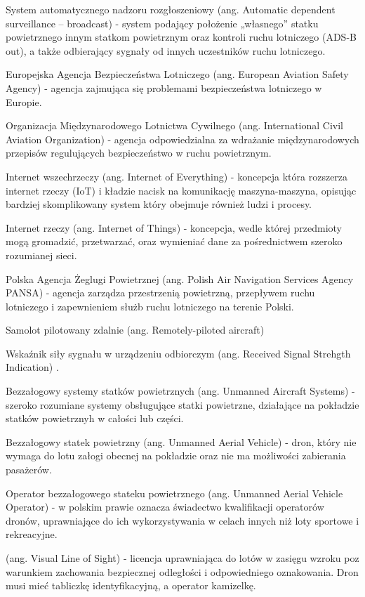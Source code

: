 \suppressfloats[t]

\begin{description}[\setleftmargin{65pt}\setlabelstyle{\bfseries}]
    \leftskip=1cm
    \item[ADS-B] System automatycznego nadzoru rozgłoszeniowy (ang. Automatic dependent surveillance – broadcast) - system podający położenie „własnego” statku powietrznego innym statkom powietrznym oraz kontroli ruchu lotniczego (ADS-B out), a także odbierający sygnały od innych uczestników ruchu lotniczego.
    \item[EASA] Europejska Agencja Bezpieczeństwa Lotniczego (ang. European Aviation Safety Agency) - agencja zajmująca się problemami bezpieczeństwa lotniczego w Europie.
    \item[ICAO] Organizacja Międzynarodowego Lotnictwa Cywilnego (ang. International Civil Aviation Organization) - agencja odpowiedzialna za wdrażanie międzynarodowych przepisów regulujących bezpieczeństwo w ruchu powietrznym.
    \item[IoE] Internet wszechrzeczy (ang. Internet of Everything) - koncepcja która rozszerza internet rzeczy (IoT) i kładzie nacisk na komunikację maszyna-maszyna, opisując bardziej skomplikowany system który obejmuje również ludzi i procesy.
    \item[IoT] Internet rzeczy (ang. Internet of Things) - koncepcja, wedle której przedmioty mogą gromadzić, przetwarzać, oraz wymieniać dane za pośrednictwem szeroko rozumianej sieci.
    \item[PAŻP] Polska Agencja Żeglugi Powietrznej (ang. Polish Air Navigation Services Agency PANSA) - agencja zarządza przestrzenią powietrzną, przepływem ruchu lotniczego i zapewnieniem służb ruchu lotniczego na terenie Polski.
    \item[RPA] Samolot pilotowany zdalnie (ang. Remotely-piloted aircraft) 
    \item[RSSI] Wskaźnik siły sygnału w urządzeniu odbiorczym (ang. Received Signal Strehgth Indication) \cite{rssi}.	    
    \item[UAS] Bezzałogowy systemy statków powietrznych (ang. Unmanned Aircraft Systems) - szeroko rozumiane systemy obsługujące statki powietrzne, działające na pokładzie statków powietrznyh w całości lub części.
    \item[UAV] Bezzałogowy statek powietrzny (ang. Unmanned Aerial Vehicle) - dron, który nie wymaga do lotu załogi obecnej na pokładzie oraz nie ma możliwości zabierania pasażerów.
    \item[UAVO] Operator bezzałogowego stateku powietrznego (ang. Unmanned Aerial Vehicle Operator) - 
w polskim prawie oznacza świadectwo kwalifikacji operatorów dronów, uprawniające do ich wykorzystywania w celach  innych niż loty sportowe i rekreacyjne.
    \item[VLOS] (ang. Visual Line of Sight) - licencja uprawniająca do lotów w zasięgu wzroku poz warunkiem zachowania bezpiecznej odległości i odpowiedniego oznakowania. Dron musi mieć tabliczkę identyfikacyjną, a operator kamizelkę.
\end{description}
